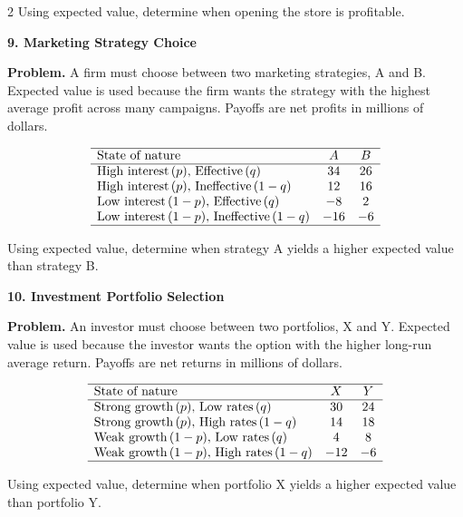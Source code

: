 \documentclass[12pt]{article}
\newcommand{\SubsectionBox}[1]{%
	\noindent\colorbox{gray!30}{%
		\parbox{\linewidth}{\textbf{#1}}%
	}\par\vspace{0.35cm}%
}
\begin{document}
\begin{multicols}{2}
		Using expected value, determine when opening the store is profitable.
		
		\vspace{0.25cm}
		\SubsectionBox{9. Marketing Strategy Choice}\vspace{-0.25cm}
		\textbf{Problem.}
		A firm must choose between two marketing strategies, A and B. Expected value is used because the firm wants the strategy with the highest average profit across many campaigns. Payoffs are net profits in millions of dollars.
		
		\[
		\begin{array}{lcc}
			\hline
			\text{State of nature} & A & B \\
			\hline
			\text{High interest}\,(p),\,\text{Effective}\,(q) & 34 & 26 \\
			\text{High interest}\,(p),\,\text{Ineffective}\,(1-q) & 12 & 16 \\
			\text{Low interest}\,(1-p),\,\text{Effective}\,(q) & -8 & 2 \\
			\text{Low interest}\,(1-p),\,\text{Ineffective}\,(1-q) & -16 & -6 \\
			\hline
		\end{array}
		\]
		
		Using expected value, determine when strategy A yields a higher expected value than strategy B.
		
		\vspace{0.25cm}
		\SubsectionBox{10. Investment Portfolio Selection}\vspace{-0.25cm}
		\textbf{Problem.}
		An investor must choose between two portfolios, X and Y. Expected value is used because the investor wants the option with the higher long-run average return. Payoffs are net returns in millions of dollars.
		
		\[
		\begin{array}{lcc}
			\hline
			\text{State of nature} & X & Y \\
			\hline
			\text{Strong growth}\,(p),\,\text{Low rates}\,(q) & 30 & 24 \\
			\text{Strong growth}\,(p),\,\text{High rates}\,(1-q) & 14 & 18 \\
			\text{Weak growth}\,(1-p),\,\text{Low rates}\,(q) & 4 & 8 \\
			\text{Weak growth}\,(1-p),\,\text{High rates}\,(1-q) & -12 & -6 \\
			\hline
		\end{array}
		\]
		
		Using expected value, determine when portfolio X yields a higher expected value than portfolio Y.
		
	\end{multicols}
	
\end{document}
